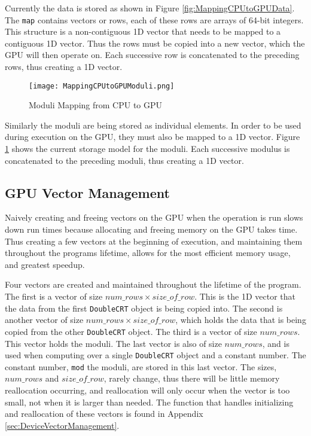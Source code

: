 Currently the data is stored as shown in Figure \ref{fig:MappingCPUtoGPUData}. The \verb|map| contains vectors or rows, each of these rows are arrays of 64-bit integers. This structure is a non-contiguous 1D vector that needs to be mapped to a contiguous 1D vector. Thus the rows must be copied into a new vector, which the GPU will then operate on. Each successive row is concatenated to the preceding rows, thus creating a 1D vector.

\begin{figure}[t!]
\centering
\texttt{[image: MappingCPUtoGPUModuli.png]}
\caption{Moduli Mapping from CPU to GPU}
\label{fig:MappingCPUtoGPUModuli}
\end{figure}

Similarly the moduli are being stored as individual elements. In order to be used during execution on the GPU, they must also be mapped to a 1D vector. Figure \ref{fig:MappingCPUtoGPUModuli} shows the current storage model for the moduli. Each successive modulus is concatenated to the preceding moduli, thus creating a 1D vector.

\subsection{GPU Vector Management}
Naively creating and freeing vectors on the GPU when the operation is run slows down run times because allocating and freeing memory on the GPU takes time. Thus creating a few vectors at the beginning of execution, and maintaining them throughout the programs lifetime, allows for the most efficient memory usage, and greatest speedup.

Four vectors are created and maintained throughout the lifetime of the program. The first is a vector of size $num\_rows \times size\_of\_row$. This is the 1D vector that the data from the first \verb|DoubleCRT| object is being copied into. The second is another vector of size $num\_rows \times size\_of\_row$, which holds the data that is being copied from the other \verb|DoubleCRT| object. The third is a vector of size $num\_rows$. This vector holds the moduli. The last vector is also of size $num\_rows$, and is used when computing over a single \verb|DoubleCRT| object and a constant number. The constant number, \verb|mod| the moduli, are stored in this last vector. The sizes, $num\_rows$ and $size\_of\_row$, rarely change, thus there will be little memory reallocation occurring, and reallocation will only occur when the vector is too small, not when it is larger than needed. The function that handles initializing and reallocation of these vectors is found in Appendix \ref{sec:DeviceVectorManagement}.

